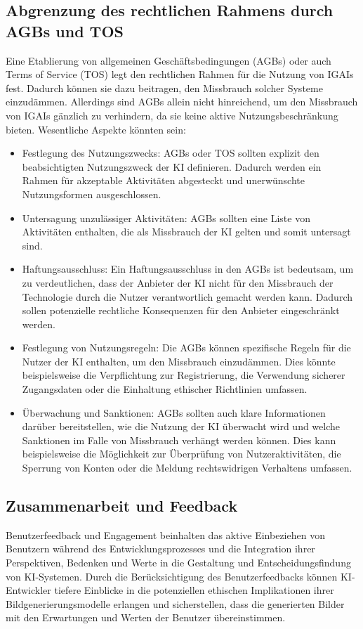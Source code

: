 \documentclass[12pt]{article}
\begin{document}
\subsection{Abgrenzung des rechtlichen Rahmens durch AGBs und TOS}
Eine Etablierung von allgemeinen Geschäftsbedingungen (AGBs) oder auch Terms of Service (TOS) legt den rechtlichen Rahmen für die Nutzung von IGAIs fest. Dadurch können sie dazu beitragen, den Missbrauch solcher Systeme einzudämmen. 
Allerdings sind AGBs allein nicht hinreichend, um den Missbrauch von IGAIs gänzlich zu verhindern, da sie keine aktive Nutzungsbeschränkung bieten. Wesentliche Aspekte könnten sein:
\begin{itemize}
    \item Festlegung des Nutzungszwecks: AGBs oder TOS sollten explizit den beabsichtigten Nutzungszweck der KI definieren. Dadurch werden ein Rahmen für akzeptable Aktivitäten abgesteckt und unerwünschte Nutzungsformen ausgeschlossen.
    \item Untersagung unzulässiger Aktivitäten: AGBs sollten eine Liste von Aktivitäten enthalten, die als Missbrauch der KI gelten und somit untersagt sind.
    \item Haftungsausschluss: Ein Haftungsausschluss in den AGBs ist bedeutsam, um zu verdeutlichen, dass der Anbieter der KI nicht für den Missbrauch der Technologie durch die Nutzer verantwortlich gemacht werden kann. Dadurch sollen potenzielle rechtliche Konsequenzen für den Anbieter eingeschränkt werden.
    \item Festlegung von Nutzungsregeln: Die AGBs  können spezifische Regeln für die Nutzer der KI enthalten, um den Missbrauch einzudämmen. Dies könnte beispielsweise die Verpflichtung zur Registrierung, die Verwendung sicherer Zugangsdaten oder die Einhaltung ethischer Richtlinien umfassen.
    \item Überwachung und Sanktionen: AGBs sollten auch klare Informationen darüber bereitstellen, wie die Nutzung der KI überwacht wird und welche Sanktionen im Falle von Missbrauch verhängt werden können. Dies kann beispielsweise die Möglichkeit zur Überprüfung von Nutzeraktivitäten, die Sperrung von Konten oder die Meldung rechtswidrigen Verhaltens umfassen.
\end{itemize}

\subsection{Zusammenarbeit und Feedback}
Benutzerfeedback und Engagement beinhalten das aktive Einbeziehen von Benutzern während des Entwicklungsprozesses und die Integration ihrer Perspektiven, Bedenken und Werte in die Gestaltung und Entscheidungsfindung von KI-Systemen. Durch die Berücksichtigung des Benutzerfeedbacks können KI-Entwickler tiefere Einblicke in die potenziellen ethischen Implikationen ihrer Bildgenerierungsmodelle erlangen und sicherstellen, dass die generierten Bilder mit den Erwartungen und Werten der Benutzer übereinstimmen.
\end{document}
